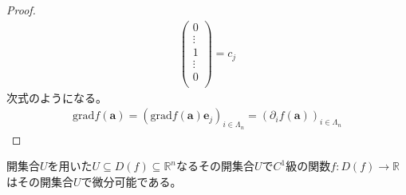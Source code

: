 \documentclass[dvipdfmx]{jsarticle}
\begin{document}
\begin{proof}
\begin{align*}
\begin{pmatrix}
0 \\
 \vdots \\
1 \\
 \vdots \\
0 \\
\end{pmatrix} = c_{j}
\end{align*}
次式のようになる。
\begin{align*}
\mathrm{grad}f\left( \mathbf{a} \right) = \left( \mathrm{grad}f\left( \mathbf{a} \right)\mathbf{e}_{j} \right)_{i \in \varLambda_{n}} = \left( \partial_{i}f\left( \mathbf{a} \right) \right)_{i \in \varLambda_{n}}
\end{align*}
\end{proof}
\begin{thm}\label{4.2.5.4}
開集合$U$を用いた$U \subseteq D(f) \subseteq \mathbb{R}^{n}$なるその開集合$U$で$C^{1}$級の関数$f:D(f) \rightarrow \mathbb{R}$はその開集合$U$で微分可能である。
\end{thm}
\end{document}

